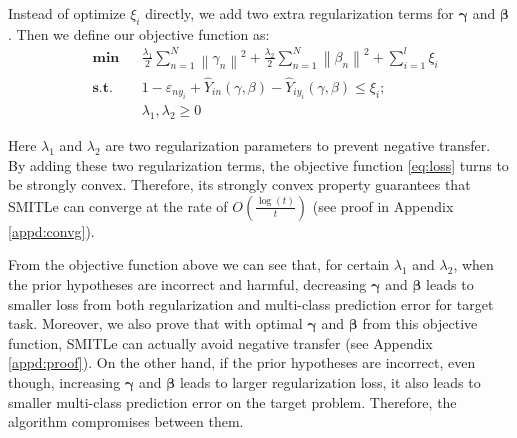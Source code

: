 Instead of optimize $\xi_i$ directly, we add two extra regularization terms for $\boldsymbol{\gamma}$ and $\boldsymbol{\beta}$. Then we define our objective function as:
\begin{equation}\label{eq:loss}
\begin{aligned}
& \textbf{min}
& & \frac{{{\lambda _1}}}{2}\sum\limits_{n = 1}^N {{{\left\| {{\gamma _n}} \right\|}^2}}  + \frac{{{\lambda _2}}}{2}\sum\limits_{n = 1}^N {{{\left\| {{\beta _n}} \right\|}^2}}  + \sum\limits_{i = 1}^l {{\xi _i}}   \\
& \textbf{s.t.}
& & 1 - {\varepsilon _{n{y_i}}} + {\hat Y_{in}}\left( {\gamma ,\beta } \right) - {\hat Y_{i{y_i}}}\left( {\gamma ,\beta } \right) \le {\xi_i};\\
& & &\lambda_1,\lambda_2 \ge 0
\end{aligned}
\end{equation}

Here $\lambda_1$ and $\lambda_2$ are two regularization parameters to prevent negative transfer. 
By adding these two regularization terms, the objective function \eqref{eq:loss} turns to be strongly convex. Therefore, its strongly convex property guarantees that SMITLe can converge at the rate of $O(\frac{\log(t)}{t})$ (see proof in Appendix \ref{appd:convg}).

From the objective function above we can see that, for certain $\lambda_1$ and $\lambda_2$, when the prior hypotheses are incorrect and harmful, decreasing $\boldsymbol{\gamma}$ and $\boldsymbol{\beta}$ leads to smaller loss from both regularization and multi-class prediction error for target task. Moreover, we also prove that with optimal $\boldsymbol{\gamma}$ and $\boldsymbol{\beta}$ from this objective function, SMITLe can actually avoid negative transfer (see Appendix \ref{appd:proof}). On the other hand, if the prior hypotheses are incorrect, even though, increasing $\boldsymbol{\gamma}$ and $\boldsymbol{\beta}$ leads to larger regularization loss, it also leads to smaller multi-class prediction error on the target problem. Therefore, the algorithm compromises between them.
 
